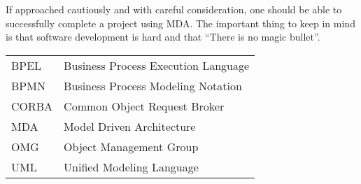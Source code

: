\documentclass[10pt,journal,letterpaper,compsoc]{IEEEtran}
\begin{document}
 If approached cautiously and with careful consideration, one should be able to successfully complete a project using MDA.  The important thing to keep in mind is that software development is hard and that ``There is no magic bullet''\cite{Brooks1995}.




%

\begin{table}[!ht]
  \label{tbl:aaa}
  \centering
  \begin{tabular}{ll}
    BPEL & Business Process Execution Language\\
    BPMN & Business Process Modeling Notation\\
    CORBA & Common Object Request Broker\\
    MDA & Model Driven Architecture\\
    OMG & Object Management Group\\
    UML & Unified Modeling Language\\
  \end{tabular}
\end{table}
\end{document}
